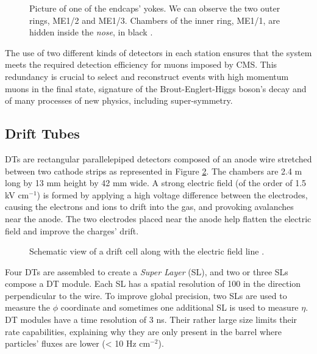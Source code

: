     			\begin{figure}[p!]
    				\centering
    				\caption{Picture of one of the endcaps' yokes. We can observe the two outer rings, ME1/2 and ME1/3. Chambers of the inner ring, ME1/1, are hidden inside the \emph{nose}, in black \Cite{Fig_CMS_Endcap}.}
    				\label{fig:muon_chambers__cms_endcap}
    			\end{figure}

    			The use of two different kinds of detectors in each station ensures that the system meets the required detection efficiency for muons imposed by CMS. This redundancy is crucial to select and reconstruct events with high momentum muons in the final state, signature of the Brout-Englert-Higgs boson's decay and of many processes of new physics, including super-symmetry.

    		\subsection{Drift Tubes}
    		\label{sec:muon_chambers__drift_tubes}

    			DTs are rectangular parallelepiped detectors composed of an anode wire stretched between two cathode strips as represented in Figure \ref{fig:muon_chambers__dt}. The chambers are 2.4 m long by 13 mm height by 42 mm wide. A strong electric field (of the order of 1.5 kV cm$ ^{-1} $) is formed by applying a high voltage difference between the electrodes, causing the electrons and ions to drift into the gas, and provoking avalanches near the anode. The two electrodes placed near the anode help flatten the electric field and improve the charges' drift. \\

    			\begin{figure}[h!]
    				\centering
    				\caption{Schematic view of a drift cell along with the electric field line \Cite{CMS_at_LHC}.}
    				\label{fig:muon_chambers__dt}
    			\end{figure}

    			Four DTs are assembled to create a \emph{Super Layer} (SL), and two or three SLs compose a DT module. Each SL has a spatial resolution of 100 \um{} in the direction perpendicular to the wire. To improve global precision, two SLs are used to measure the $ \phi $ coordinate and sometimes one additional SL is used to measure $ \eta $. DT modules have a time resolution of 3 ns. Their rather large size limits their rate capabilities, explaining why they are only present in the barrel where particles' fluxes are lower (< 10 Hz cm$ ^{-2} $).


